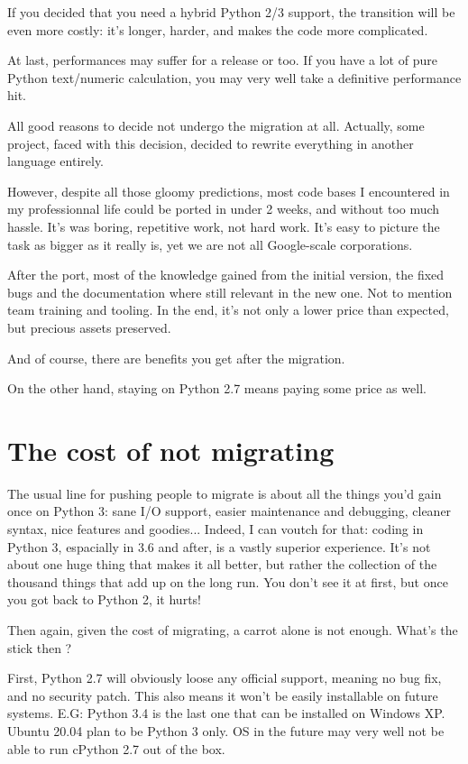 If you decided that you need a hybrid Python 2/3 support, the transition will be even more costly: it's longer, harder, and makes the code more complicated.

At last, performances may suffer for a release or too. If you have a lot of pure Python text/numeric calculation, you may very well take a definitive performance hit.

All good reasons to decide not undergo the migration at all. Actually, some project, faced with this decision, decided to rewrite everything in another language entirely.

However, despite all those gloomy predictions, most code bases I encountered in my professionnal life could be ported in under 2 weeks, and without too much hassle. It's was boring, repetitive work, not hard work. It's easy to picture the task as bigger as it really is, yet we are not all Google-scale corporations.

After the port, most of the knowledge gained from the initial version, the fixed bugs and the documentation where still relevant in the new one. Not to mention team training and tooling. In the end, it's not only a lower price than expected, but precious assets preserved.

And of course, there are benefits you get after the migration.

On the other hand, staying on Python 2.7 means paying some price as well.

\section{The cost of not migrating}

The usual line for pushing people to migrate is about all the things you'd gain once on Python 3: sane I/O support, easier maintenance and debugging, cleaner syntax, nice features and goodies... Indeed, I can voutch for that: coding in Python 3, espacially in 3.6 and after, is a vastly superior experience. It's not about one huge thing that makes it all better, but rather the collection of the thousand things that add up on the long run. You don't see it at first, but once you got back to Python 2, it hurts!

Then again, given the cost of migrating, a carrot alone is not enough. What's the stick then ?

First, Python 2.7 will obviously loose any official support, meaning no bug fix, and no security patch. This also means it won't be easily installable on future systems. E.G: Python 3.4 is the last one that can be installed on Windows XP. Ubuntu 20.04 plan to be Python 3 only. OS in the future may very well not be able to run cPython 2.7 out of the box.

